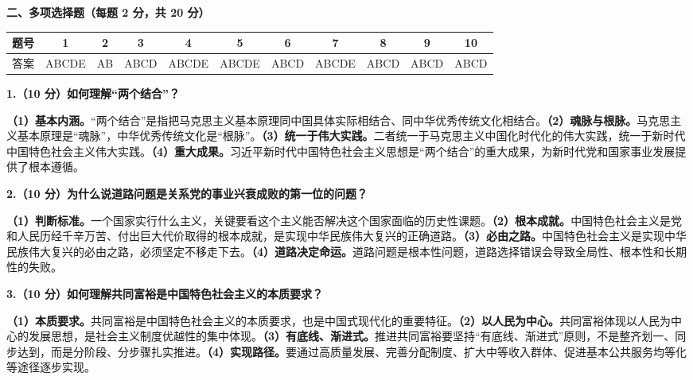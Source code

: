 \documentclass[12pt, a4paper]{article}
\newcounter{bigq}
\newcommand{\BigQ}[1]{%
  \stepcounter{bigq}%
  \vspace{6pt}%
  \noindent{\large\bfseries 第\chinese{bigq}大题\quad #1}%
  \vspace{4pt}\par
}
\begin{document}
\noindent\textbf{二、多项选择题（每题 2 分，共 20 分）}
\vspace{4pt}
\begin{center}
\small
\setlength{\tabcolsep}{4pt}
\begin{tabular}{|c|c|c|c|c|c|c|c|c|c|c|}
\hline
题号 & 1 & 2 & 3 & 4 & 5 & 6 & 7 & 8 & 9 & 10 \\
\hline
答案 & ABCDE & AB & ABCD & ABCDE & ABCDE & ABCD & ABCDE & ABCD & ABCD & ABCD \\
\hline
\end{tabular}
\end{center}
\vspace{10pt}
\BigQ{简答题参考答案}
\vspace{4pt}

\noindent\textbf{1.（10 分）如何理解``两个结合''？}
\begin{answerbox}
\textbf{（1）基本内涵。}``两个结合''是指把马克思主义基本原理同中国具体实际相结合、同中华优秀传统文化相结合。\textbf{（2）魂脉与根脉。}马克思主义基本原理是``魂脉''，中华优秀传统文化是``根脉''。\textbf{（3）统一于伟大实践。}二者统一于马克思主义中国化时代化的伟大实践，统一于新时代中国特色社会主义伟大实践。\textbf{（4）重大成果。}习近平新时代中国特色社会主义思想是``两个结合''的重大成果，为新时代党和国家事业发展提供了根本遵循。
\end{answerbox}
\vspace{6pt}

\noindent\textbf{2.（10 分）为什么说道路问题是关系党的事业兴衰成败的第一位的问题？}
\begin{answerbox}
\textbf{（1）判断标准。}一个国家实行什么主义，关键要看这个主义能否解决这个国家面临的历史性课题。\textbf{（2）根本成就。}中国特色社会主义是党和人民历经千辛万苦、付出巨大代价取得的根本成就，是实现中华民族伟大复兴的正确道路。\textbf{（3）必由之路。}中国特色社会主义是实现中华民族伟大复兴的必由之路，必须坚定不移走下去。\textbf{（4）道路决定命运。}道路问题是根本性问题，道路选择错误会导致全局性、根本性和长期性的失败。
\end{answerbox}
\vspace{6pt}

\noindent\textbf{3.（10 分）如何理解共同富裕是中国特色社会主义的本质要求？}
\begin{answerbox}
\textbf{（1）本质要求。}共同富裕是中国特色社会主义的本质要求，也是中国式现代化的重要特征。\textbf{（2）以人民为中心。}共同富裕体现以人民为中心的发展思想，是社会主义制度优越性的集中体现。\textbf{（3）有底线、渐进式。}推进共同富裕要坚持``有底线、渐进式''原则，不是整齐划一、同步达到，而是分阶段、分步骤扎实推进。\textbf{（4）实现路径。}要通过高质量发展、完善分配制度、扩大中等收入群体、促进基本公共服务均等化等途径逐步实现。
\end{answerbox}
\vspace{6pt}
\end{document}
